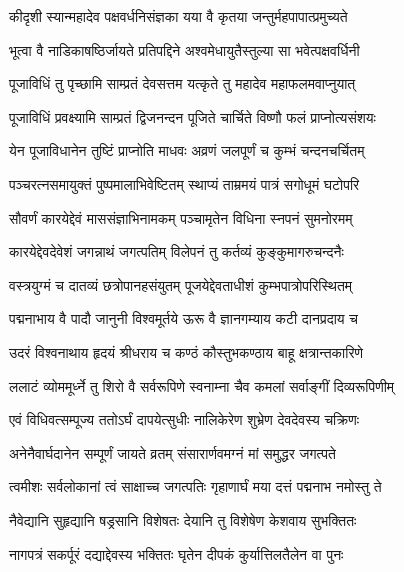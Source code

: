 \twolineshloka
{कीदृशी स्यान्महादेव पक्षवर्धनिसंज्ञका}
{यया वै कृतया जन्तुर्महपापात्प्रमुच्यते}%



\twolineshloka
{भूत्वा वै नाडिकाषष्ठिर्जायते प्रतिपद्दिने}
{अश्वमेधायुतैस्तुल्या सा भवेत्पक्षवर्धिनी}%


\twolineshloka
{पूजाविधिं तु पृच्छामि साम्प्रतं देवसत्तम}
{यत्कृते तु महादेव महाफलमवाप्नुयात्}%


\twolineshloka
{पूजाविधिं प्रवक्ष्यामि साम्प्रतं द्विजनन्दन}
{पूजिते चार्चिते विष्णौ फलं प्राप्नोत्यसंशयः}%

\twolineshloka
{येन पूजाविधानेन तुष्टिं प्राप्नोति माधवः}
{अव्रणं जलपूर्णं च कुम्भं चन्दनचर्चितम्}%

\twolineshloka
{पञ्चरत्नसमायुक्तं पुष्पमालाभिवेष्टितम्}
{स्थाप्यं ताम्रमयं पात्रं सगोधूमं घटोपरि}%

\twolineshloka
{सौवर्णं कारयेद्देवं माससंज्ञाभिनामकम्}
{पञ्चामृतेन विधिना स्नपनं सुमनोरमम्}%

\twolineshloka
{कारयेद्देवदेवेशं जगन्नाथं जगत्पतिम्}
{विलेपनं तु कर्तव्यं कुङ्कुमागरुचन्दनैः}%

\twolineshloka
{वस्त्रयुग्मं च दातव्यं छत्रोपानहसंयुतम्}
{पूजयेद्देवताधीशं कुम्भपात्रोपरिस्थितम्}%

\twolineshloka
{पद्मनाभाय वै पादौ जानुनी विश्वमूर्तये}
{ऊरू वै ज्ञानगम्याय कटी दानप्रदाय च}%

\twolineshloka
{उदरं विश्वनाथाय हृदयं श्रीधराय च}
{कण्ठं कौस्तुभकण्ठाय बाहू क्षत्रान्तकारिणे}%

\twolineshloka
{ललाटं व्योममूर्ध्ने तु शिरो वै सर्वरूपिणे}
{स्वनाम्ना चैव कमलां सर्वाङ्गीं दिव्यरूपिणीम्}%

\twolineshloka
{एवं विधिवत्सम्पूज्य ततोऽर्घं दापयेत्सुधीः}
{नालिकेरेण शुभ्रेण देवदेवस्य चक्रिणः}%

\twolineshloka
{अनेनैवार्घदानेन सम्पूर्णं जायते व्रतम्}
{संसारार्णवमग्नं मां समुद्धर जगत्पते}%

\twolineshloka
{त्वमीशः सर्वलोकानां त्वं साक्षाच्च जगत्पतिः}
{गृहाणार्घं मया दत्तं पद्मनाभ नमोस्तु ते}%

\twolineshloka
{नैवेद्यानि सुहृद्यानि षड्रसानि विशेषतः}
{देयानि तु विशेषेण केशवाय सुभक्तितः}%

\twolineshloka
{नागपत्रं सकर्पूरं दद्याद्देवस्य भक्तितः}
{घृतेन दीपकं कुर्यात्तिलतैलेन वा पुनः}%

